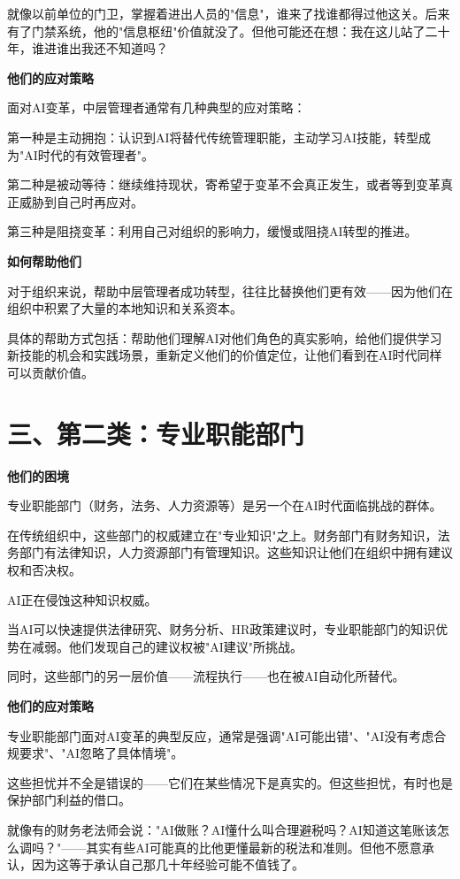 就像以前单位的门卫，掌握着进出人员的"信息"，谁来了找谁都得过他这关。后来有了门禁系统，他的"信息枢纽"价值就没了。但他可能还在想：我在这儿站了二十年，谁进谁出我还不知道吗？

\textbf{他们的应对策略}

面对AI变革，中层管理者通常有几种典型的应对策略：

第一种是主动拥抱：认识到AI将替代传统管理职能，主动学习AI技能，转型成为"AI时代的有效管理者"。

第二种是被动等待：继续维持现状，寄希望于变革不会真正发生，或者等到变革真正威胁到自己时再应对。

第三种是阻挠变革：利用自己对组织的影响力，缓慢或阻挠AI转型的推进。

\textbf{如何帮助他们}

对于组织来说，帮助中层管理者成功转型，往往比替换他们更有效——因为他们在组织中积累了大量的本地知识和关系资本。

具体的帮助方式包括：帮助他们理解AI对他们角色的真实影响，给他们提供学习新技能的机会和实践场景，重新定义他们的价值定位，让他们看到在AI时代同样可以贡献价值。

\section{三、第二类：专业职能部门}


\textbf{他们的困境}

专业职能部门（财务，法务、人力资源等）是另一个在AI时代面临挑战的群体。

在传统组织中，这些部门的权威建立在"专业知识"之上。财务部门有财务知识，法务部门有法律知识，人力资源部门有管理知识。这些知识让他们在组织中拥有建议权和否决权。

AI正在侵蚀这种知识权威。

当AI可以快速提供法律研究、财务分析、HR政策建议时，专业职能部门的知识优势在减弱。他们发现自己的建议权被"AI建议"所挑战。

同时，这些部门的另一层价值——流程执行——也在被AI自动化所替代。

\textbf{他们的应对策略}

专业职能部门面对AI变革的典型反应，通常是强调"AI可能出错"、"AI没有考虑合规要求"、"AI忽略了具体情境"。

这些担忧并不全是错误的——它们在某些情况下是真实的。但这些担忧，有时也是保护部门利益的借口。

就像有的财务老法师会说："AI做账？AI懂什么叫合理避税吗？AI知道这笔账该怎么调吗？"——其实有些AI可能真的比他更懂最新的税法和准则。但他不愿意承认，因为这等于承认自己那几十年经验可能不值钱了。

